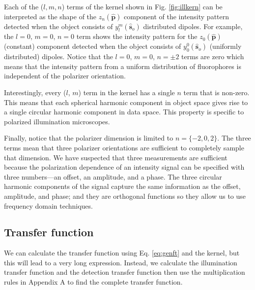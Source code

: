 \documentclass[11pt]{article}
\providecommand{\so}[1]{\mathbf{\hat{s}}_o}
\providecommand{\mh}[1]{\mathbf{\hat{#1}}}
\begin{document}
Each of the ($l,m,n$) terms of the kernel shown in Fig. \ref{fig:illkern} can be
interpreted as the shape of the $z_n(\mh{p})$ component of the intensity pattern
detected when the object consists of $y_l^m(\so{})$ distributed dipoles. For
example, the $l=0$, $m=0$, $n=0$ term shows the intensity pattern for the
$z_0(\mh{p})$ (constant) component detected when the object consists of
$y_0^0(\so{})$ (uniformly distributed) dipoles. Notice that the $l=0$, $m=0$,
$n=\pm 2$ terms are zero which means that the intensity pattern from a uniform
distribution of fluorophores is independent of the polarizer orientation.

Interestingly, every ($l$, $m$) term in the kernel has a single $n$ term that is
non-zero. This means that each spherical harmonic component in object space
gives rise to a single circular harmonic component in data space. This property
is specific to polarized illumination microscopes.

Finally, notice that the polarizer dimension is limited to $n= \{-2, 0, 2\}$.
The three terms mean that three polarizer orientations are sufficient to
completely sample that dimension. We have suspected that three measurements are
sufficient because the polarization dependence of an intensity signal can be
specified with three numbers---an offset, an amplitude, and a phase. The three
circular harmonic components of the signal capture the same information as the
offset, amplitude, and phase; and they are orthogonal functions so they allow us
to use frequency domain techniques.

\subsection{Transfer function}
We can calculate the transfer function using Eq. \ref{eq:genft} and the kernel,
but this will lead to a very long expression. Instead, we calculate the
illumination transfer function and the detection transfer function then use the
multiplication rules in Appendix A to find the complete transfer function.
\end{document}
